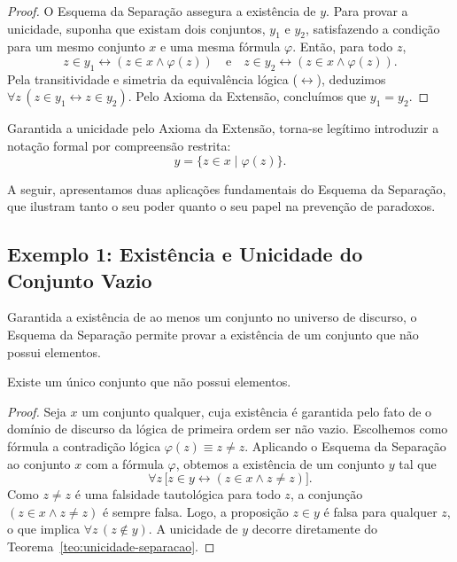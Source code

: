 \begin{proof}
O Esquema da Separação assegura a existência de $y$. Para provar a unicidade, suponha que existam dois conjuntos, $y_1$ e $y_2$, satisfazendo a condição para um mesmo conjunto $x$ e uma mesma fórmula $\varphi$. Então, para todo $z$,
\begin{equation*}
    z \in y_1 \leftrightarrow (z \in x \land \varphi(z))
    \quad \text{e} \quad
    z \in y_2 \leftrightarrow (z \in x \land \varphi(z)).
\end{equation*}
Pela transitividade e simetria da equivalência lógica ($\leftrightarrow$), deduzimos $\forall z\, (z \in y_1 \leftrightarrow z \in y_2)$. Pelo Axioma da Extensão, concluímos que $y_1 = y_2$.
\end{proof}

Garantida a unicidade pelo Axioma da Extensão, torna-se legítimo introduzir a notação formal por compreensão restrita:
\begin{equation*}
    y = \{z \in x \mid \varphi(z)\}.
\end{equation*}

A seguir, apresentamos duas aplicações fundamentais do Esquema da Separação, que ilustram tanto o seu poder quanto o seu papel na prevenção de paradoxos.

\subsection{Exemplo 1: Existência e Unicidade do Conjunto Vazio}
\label{sec:conjunto-vazio}

Garantida a existência de ao menos um conjunto no universo de discurso, o Esquema da Separação permite provar a existência de um conjunto que não possui elementos.

\begin{teorema}
\label{teo:conjunto-vazio}
Existe um único conjunto que não possui elementos.
\end{teorema}

\begin{proof}
Seja $x$ um conjunto qualquer, cuja existência é garantida pelo fato de o domínio de discurso da lógica de primeira ordem ser não vazio. Escolhemos como fórmula a contradição lógica $\varphi(z) \equiv z \neq z$. Aplicando o Esquema da Separação ao conjunto $x$ com a fórmula $\varphi$, obtemos a existência de um conjunto $y$ tal que
\begin{equation*}
    \forall z\, \bigl[z \in y \leftrightarrow (z \in x \land z \neq z)\bigr].
\end{equation*}
Como $z \neq z$ é uma falsidade tautológica para todo $z$, a conjunção $(z \in x \land z \neq z)$ é sempre falsa. Logo, a proposição $z \in y$ é falsa para qualquer $z$, o que implica $\forall z\, (z \notin y)$. A unicidade de $y$ decorre diretamente do Teorema~\ref{teo:unicidade-separacao}.
\end{proof}


